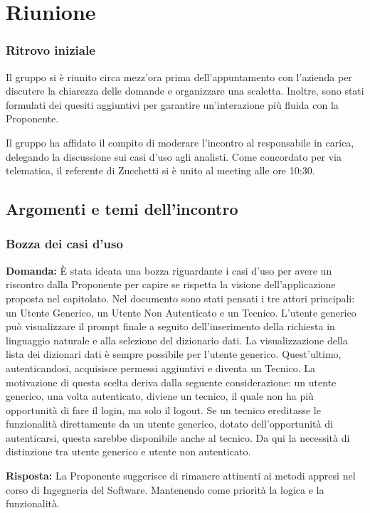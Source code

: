 \section{Riunione}
\subsubsection{Ritrovo iniziale}
Il gruppo si è riunito circa mezz’ora prima dell’appuntamento con l’azienda per discutere la chiarezza delle domande e organizzare una scaletta. Inoltre, sono stati formulati dei quesiti aggiuntivi per garantire un’interazione più fluida con la Proponente.

Il gruppo ha affidato il compito di moderare l’incontro al responsabile in carica, delegando la discussione sui casi d’uso agli analisti. Come concordato per via telematica, il referente di Zucchetti si è unito al meeting alle ore 10:30.

\subsection{Argomenti e temi dell'incontro}


\subsubsection{Bozza dei casi d'uso}

\textbf{Domanda:} È stata ideata una bozza riguardante i casi d'uso per avere un riscontro dalla Proponente per capire se rispetta la visione dell’applicazione proposta nel capitolato.
Nel documento sono stati pensati i tre attori principali: un Utente Generico, un Utente Non Autenticato e un Tecnico.
L'utente generico può visualizzare il prompt finale a seguito dell'inserimento della richiesta in linguaggio naturale e alla selezione del dizionario dati. La visualizzazione della lista dei dizionari dati è sempre possibile per l'utente generico. Quest'ultimo, autenticandosi, acquisisce permessi aggiuntivi e diventa un Tecnico.
La motivazione di questa scelta deriva dalla seguente considerazione: un utente generico, una volta autenticato, diviene un tecnico, il quale non ha più opportunità di fare il login, ma solo il logout. Se un tecnico ereditasse le funzionalità direttamente da un utente generico, dotato dell'opportunità di autenticarsi, questa sarebbe disponibile anche al tecnico. Da qui la necessità di distinzione tra utente generico e utente non autenticato.

\textbf{Risposta:} La Proponente suggerisce di rimanere attinenti ai metodi appresi nel corso di Ingegneria del Software. Mantenendo come priorità la logica e la funzionalità.

